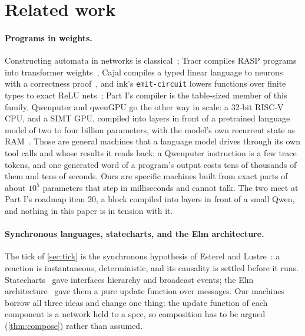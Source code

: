 \section{Related work}
\label{sec:related}

\paragraph{Programs in weights.} Constructing automata in networks is classical~\citep{omlin1996constructing,siegelmann1995computational};
Tracr compiles RASP programs into transformer weights~\citep{lindner2023tracr}, Cajal compiles a typed linear
language to neurons with a correctness proof~\citep{cajal,cajalrec}, and ink's \texttt{emit-circuit} lowers
functions over finite types to exact ReLU nets~\citep{inklang}; Part I's compiler is the table-sized member of
this family. Qwenputer and qwenGPU go the other way in scale: a 32-bit RISC-V CPU, and a SIMT GPU, compiled into
layers in front of a pretrained language model of two to four billion parameters, with the model's own recurrent
state as RAM~\citep{qwenputer,qwengpu}. Those are general machines that a language model drives through its own tool calls and whose results it
reads back; a Qwenputer instruction is a few trace tokens, and one generated word of a program's output costs
tens of thousands of them and tens of seconds. Ours are specific machines built from exact parts of about $10^5$ parameters that step in
milliseconds and cannot talk. The two meet at Part I's roadmap item 20, a \method block compiled into layers in
front of a small Qwen, and nothing in this paper is in tension with it.

\paragraph{Synchronous languages, statecharts, and the Elm architecture.} The tick of \cref{sec:tick} is the
synchronous hypothesis of Esterel and Lustre~\citep{berry1992esterel,halbwachs1991lustre,benveniste2003synchronous}:
a reaction is instantaneous, deterministic, and its causality is settled before it runs. Statecharts~\citep{harel1987statecharts}
gave interfaces hierarchy and broadcast events; the Elm architecture~\citep{czaplicki2013elm} gave them a pure
update function over messages. Our machines borrow all three ideas and change one thing: the update function of
each component is a network held to a spec, so composition has to be argued (\cref{thm:compose}) rather than
assumed.

